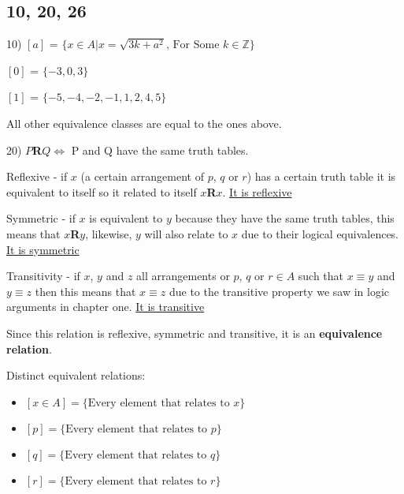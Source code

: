 \documentclass[11pt]{article}
\begin{document}
\subsection{10, 20, 26}
\begin{flushleft}

10) $[a]$ = $\{x\in A|x=\sqrt{3k+a^2}\text{, For Some }k\in\mathbb{Z}\}$

$[0]$ = $\{ -3, 0, 3 \}$

$[1]$ = $\{ -5,-4,-2,-1,1,2,4,5\}$

All other equivalence classes are equal to the ones above.

\hrulefill

20) $P$\textbf{R}$Q\Leftrightarrow$ P and Q have the same truth tables.

\vspace{2mm}

Reflexive - if $x$ (a certain arrangement of $p$, $q$ or $r$) has a certain truth table it is equivalent to itself so it related to itself $x$\textbf{R}$x$. \underline{It is reflexive}

\vspace{2mm}

Symmetric - if $x$ is equivalent to $y$ because they have the same truth tables, this means that $x$\textbf{R}$y$, likewise, $y$ will also relate to $x$ due to their logical equivalences. \underline{It is symmetric}

\vspace{2mm}

Transitivity - if $x$, $y$ and $z$ all arrangements or $p$, $q$ or $r\in A$ such that $x\equiv y$ and $y\equiv z$ then this means that $x\equiv z$ due to the transitive property we saw in logic arguments in chapter one. \underline{It is transitive}

\vspace{2mm}

Since this relation is reflexive, symmetric and transitive, it is an \textbf{equivalence relation}.

\vspace{2mm}

Distinct equivalent relations:
\begin{itemize}
\item $[x\in A] =\{\text{Every element that relates to }x \} $
\item $[p] =\{\text{Every element that relates to }p \} $
\item $[q] =\{\text{Every element that relates to }q \} $
\item $[r] =\{\text{Every element that relates to }r \} $
\end{itemize}


\end{flushleft}
\end{document}

